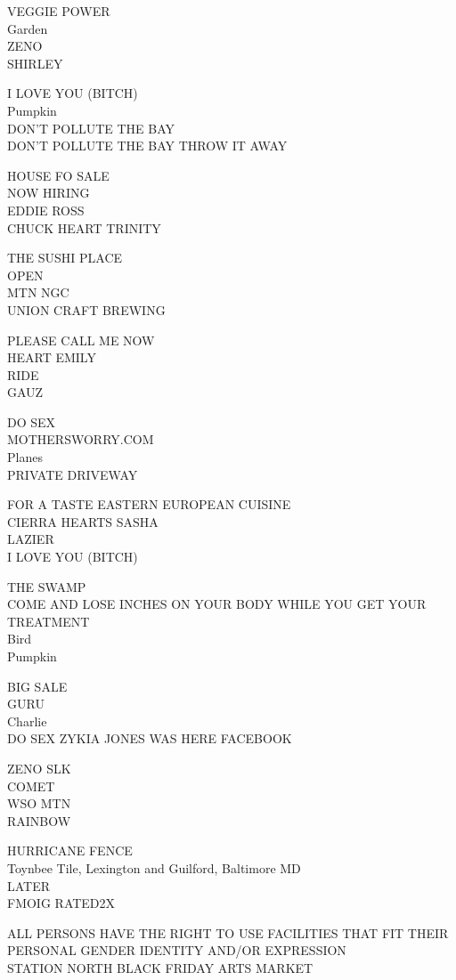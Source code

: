 \documentclass[10pt,letterpaper]{article}
\begin{document}
VEGGIE POWER\\
Garden\\
ZENO\\
SHIRLEY

I LOVE YOU (BITCH)\\
Pumpkin\\
DON'T POLLUTE THE BAY\\
DON'T POLLUTE THE BAY THROW IT AWAY

HOUSE FO SALE\\
NOW HIRING\\
EDDIE ROSS\\
CHUCK HEART TRINITY

THE SUSHI PLACE\\
OPEN\\
MTN NGC\\
UNION CRAFT BREWING

PLEASE CALL ME NOW\\
HEART EMILY\\
RIDE\\
GAUZ

DO SEX\\
MOTHERSWORRY.COM\\
Planes\\
PRIVATE DRIVEWAY

FOR A TASTE EASTERN EUROPEAN CUISINE\\
CIERRA HEARTS SASHA\\
LAZIER\\
I LOVE YOU (BITCH)

THE SWAMP\\
COME AND LOSE INCHES ON YOUR BODY WHILE YOU GET YOUR TREATMENT\\
Bird\\
Pumpkin

BIG SALE\\
GURU\\
Charlie\\
DO SEX ZYKIA JONES WAS HERE FACEBOOK

ZENO SLK\\
COMET\\
WSO MTN\\
RAINBOW

HURRICANE FENCE\\
Toynbee Tile, Lexington and Guilford, Baltimore MD\\
LATER\\
FMOIG RATED2X

ALL PERSONS HAVE THE RIGHT TO USE FACILITIES THAT FIT THEIR PERSONAL GENDER IDENTITY AND/OR EXPRESSION\\
STATION NORTH BLACK FRIDAY ARTS MARKET
\end{document}

